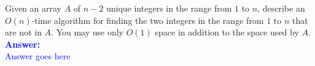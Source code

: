\item{}
Given an array $A$ of $n-2$ unique integers in the range from $1$ to $n$,
describe an $O(n)$-time algorithm for finding the two integers in the range from
$1$ to $n$ that are not in $A$. You may use only $O(1)$ space in addition to the
space used by $A$.\\[12pt]
\ifanswers
\textcolor{blue}{
\textbf{Answer:}\\[6pt]
Answer goes here
}
\newpage
\fi
